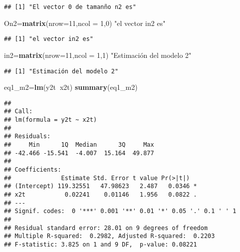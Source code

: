 \documentclass[
]{article}
\newenvironment{Shaded}{\begin{snugshade}}{\end{snugshade}}
\newcommand{\DataTypeTok}[1]{\textcolor[rgb]{0.13,0.29,0.53}{#1}}
\newcommand{\DecValTok}[1]{\textcolor[rgb]{0.00,0.00,0.81}{#1}}
\newcommand{\KeywordTok}[1]{\textcolor[rgb]{0.13,0.29,0.53}{\textbf{#1}}}
\newcommand{\NormalTok}[1]{#1}
\newcommand{\OperatorTok}[1]{\textcolor[rgb]{0.81,0.36,0.00}{\textbf{#1}}}
\newcommand{\StringTok}[1]{\textcolor[rgb]{0.31,0.60,0.02}{#1}}
\begin{document}
\begin{verbatim}
## [1] "El vector 0 de tamanño n2 es"
\end{verbatim}

\begin{Shaded}
\begin{Highlighting}[]
\NormalTok{On2=}\KeywordTok{matrix}\NormalTok{(}\DataTypeTok{nrow=}\DecValTok{11}\NormalTok{,}\DataTypeTok{ncol =} \DecValTok{1}\NormalTok{,}\DecValTok{0}\NormalTok{)}
\StringTok{"el vector in2 es"}
\end{Highlighting}
\end{Shaded}

\begin{verbatim}
## [1] "el vector in2 es"
\end{verbatim}

\begin{Shaded}
\begin{Highlighting}[]
\NormalTok{in2=}\KeywordTok{matrix}\NormalTok{(}\DataTypeTok{nrow=}\DecValTok{11}\NormalTok{,}\DataTypeTok{ncol =} \DecValTok{1}\NormalTok{,}\DecValTok{1}\NormalTok{)}
\StringTok{"Estimación del modelo 2"}
\end{Highlighting}
\end{Shaded}

\begin{verbatim}
## [1] "Estimación del modelo 2"
\end{verbatim}

\begin{Shaded}
\begin{Highlighting}[]
\NormalTok{eq1_m2=}\KeywordTok{lm}\NormalTok{(y2t}\OperatorTok{~}\NormalTok{x2t)}
\KeywordTok{summary}\NormalTok{(eq1_m2)}
\end{Highlighting}
\end{Shaded}

\begin{verbatim}
## 
## Call:
## lm(formula = y2t ~ x2t)
## 
## Residuals:
##     Min      1Q  Median      3Q     Max 
## -42.466 -15.541  -4.007  15.164  49.877 
## 
## Coefficients:
##              Estimate Std. Error t value Pr(>|t|)  
## (Intercept) 119.32551   47.98623   2.487   0.0346 *
## x2t           0.02241    0.01146   1.956   0.0822 .
## ---
## Signif. codes:  0 '***' 0.001 '**' 0.01 '*' 0.05 '.' 0.1 ' ' 1
## 
## Residual standard error: 28.01 on 9 degrees of freedom
## Multiple R-squared:  0.2982, Adjusted R-squared:  0.2203 
## F-statistic: 3.825 on 1 and 9 DF,  p-value: 0.08221
\end{verbatim}
\end{document}
